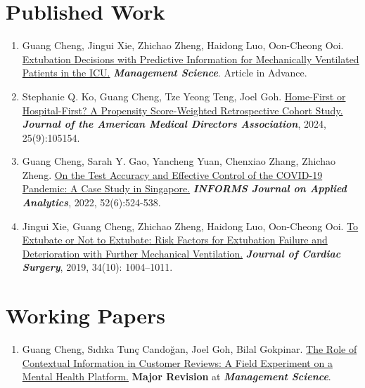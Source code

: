 \documentclass[12pt, a4paper]{article}
\begin{document}
{\section*{Published Work}

\begin{enumerate}

	\item Guang Cheng, Jingui Xie, Zhichao Zheng, Haidong Luo, Oon-Cheong Ooi.
	\href{https://doi.org/10.1287/mnsc.2021.01427}{Extubation Decisions with Predictive Information for Mechanically Ventilated Patients in the ICU.}
	\textit{\textbf{Management Science}}. Article in Advance.
	
	\item Stephanie Q. Ko, Guang Cheng, Tze Yeong Teng, Joel Goh.
	\href{https://doi.org/10.1016/j.jamda.2024.105154}{Home-First or Hospital-First? A Propensity Score-Weighted Retrospective Cohort Study.}
	\textit{\textbf{Journal of the American Medical Directors Association}}, 2024, 25(9):105154.
	
	\item Guang Cheng, Sarah Y. Gao, Yancheng Yuan, Chenxiao Zhang, Zhichao Zheng. 
	\href{https://doi.org/10.1287/inte.2022.1117}{On the Test Accuracy and Effective Control of the COVID-19 Pandemic: A Case Study in Singapore.} 
	\textit{\textbf{INFORMS Journal on Applied Analytics}}, 2022, 52(6):524-538.

	\item Jingui Xie, Guang Cheng, Zhichao Zheng, Haidong Luo, Oon-Cheong Ooi. 
	\href{https://doi.org/10.1111/jocs.14189}{To Extubate or Not to Extubate: Risk Factors for Extubation Failure and Deterioration with Further Mechanical Ventilation.}
	\textit{\textbf{Journal of Cardiac Surgery}}, 2019, 34(10): 1004–1011.

\end{enumerate}




\section*{Working Papers}

\begin{enumerate}[leftmargin=30pt, resume]
	
	\item Guang Cheng, S\i{}d\i{}ka Tun\c{c} Cando\u{g}an, Joel Goh, Bilal Gokpinar.
	\href{https://ssrn.com/abstract=4956298}{The Role of Contextual Information in Customer Reviews: A Field Experiment on a Mental Health Platform.} {\bf Major Revision} at \textit{\textbf{Management Science}}.


\end{enumerate}}
\end{document}
